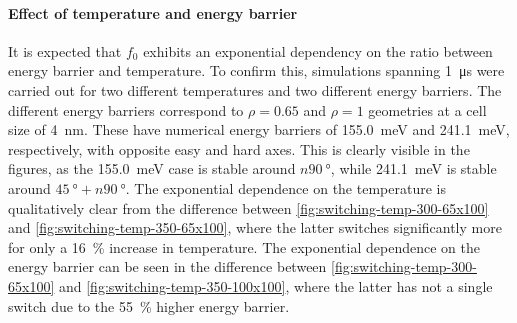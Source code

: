 \documentclass[12pt,a4paper]{article}
\begin{document}
\paragraph{Effect of temperature and energy barrier}
It is expected that $f_0$ exhibits an exponential dependency on the ratio between energy barrier and temperature. To confirm this, simulations spanning \SI{1}{\micro\second} were carried out for two different temperatures and two different energy barriers. The different energy barriers correspond to $\rho=0.65$ and $\rho=1$ geometries at a cell size of \SI{4}{\nano\metre}. These have numerical energy barriers of \SI{155.0}{\milli\electronvolt} and \SI{241.1}{\milli\electronvolt}, respectively, with opposite easy and hard axes. This is clearly visible in the figures, as the \SI{155.0}{\milli\electronvolt} case is stable around $n\SI{90}{\degree}$, while \SI{241.1}{\milli\electronvolt} is stable around $\SI{45}{\degree} + n\SI{90}{\degree}$. The exponential dependence on the temperature is qualitatively clear from the difference between \cref{fig:switching-temp-300-65x100} and \ref{fig:switching-temp-350-65x100}, where the latter switches significantly more for only a \SI{16}{\percent} increase in temperature. The exponential dependence on the energy barrier can be seen in the difference between \cref{fig:switching-temp-300-65x100} and \ref{fig:switching-temp-350-100x100}, where the latter has not a single switch due to the \SI{55}{\percent} higher energy barrier. 
\end{document}
